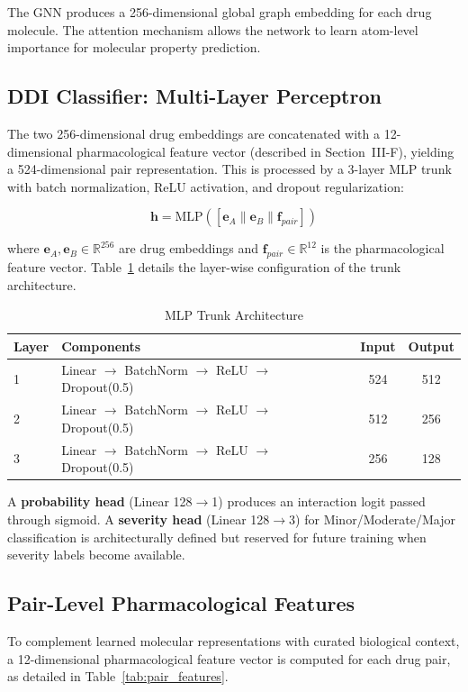 \documentclass[conference]{IEEEtran}
\begin{document}
The GNN produces a 256-dimensional global graph embedding for each drug molecule. The attention mechanism allows the network to learn atom-level importance for molecular property prediction.

\subsection{DDI Classifier: Multi-Layer Perceptron}
The two 256-dimensional drug embeddings are concatenated with a 12-dimensional pharmacological feature vector (described in Section~III-F), yielding a 524-dimensional pair representation. This is processed by a 3-layer MLP trunk with batch normalization, ReLU activation, and dropout regularization:

\begin{equation}
\mathbf{h} = \text{MLP}([\mathbf{e}_A \| \mathbf{e}_B \| \mathbf{f}_{pair}])
\end{equation}

where $\mathbf{e}_A, \mathbf{e}_B \in \mathbb{R}^{256}$ are drug embeddings and $\mathbf{f}_{pair} \in \mathbb{R}^{12}$ is the pharmacological feature vector. Table~\ref{tab:mlp_trunk} details the layer-wise configuration of the trunk architecture.

\begin{table}[htbp]
\caption{MLP Trunk Architecture}
\label{tab:mlp_trunk}
\centering
\begin{tabular}{@{}llcc@{}}
\toprule
\textbf{Layer} & \textbf{Components} & \textbf{Input} & \textbf{Output} \\
\midrule
1 & Linear $\rightarrow$ BatchNorm $\rightarrow$ ReLU $\rightarrow$ Dropout(0.5) & 524 & 512 \\
2 & Linear $\rightarrow$ BatchNorm $\rightarrow$ ReLU $\rightarrow$ Dropout(0.5) & 512 & 256 \\
3 & Linear $\rightarrow$ BatchNorm $\rightarrow$ ReLU $\rightarrow$ Dropout(0.5) & 256 & 128 \\
\bottomrule
\end{tabular}
\end{table}

A \textbf{probability head} (Linear 128$\rightarrow$1) produces an interaction logit passed through sigmoid. A \textbf{severity head} (Linear 128$\rightarrow$3) for Minor/Moderate/Major classification is architecturally defined but reserved for future training when severity labels become available.

\subsection{Pair-Level Pharmacological Features}
To complement learned molecular representations with curated biological context, a 12-dimensional pharmacological feature vector is computed for each drug pair, as detailed in Table~\ref{tab:pair_features}.
\end{document}
